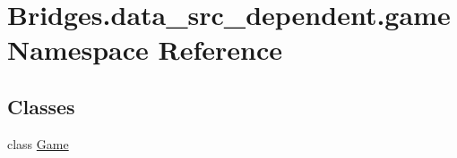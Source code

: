 \hypertarget{namespace_bridges_1_1data__src__dependent_1_1game}{}\section{Bridges.\+data\+\_\+src\+\_\+dependent.\+game Namespace Reference}
\label{namespace_bridges_1_1data__src__dependent_1_1game}
\subsection*{Classes}
\begin{DoxyCompactItemize}
\item 
class \hyperlink{class_bridges_1_1data__src__dependent_1_1game_1_1_game}{Game}
\end{DoxyCompactItemize}
